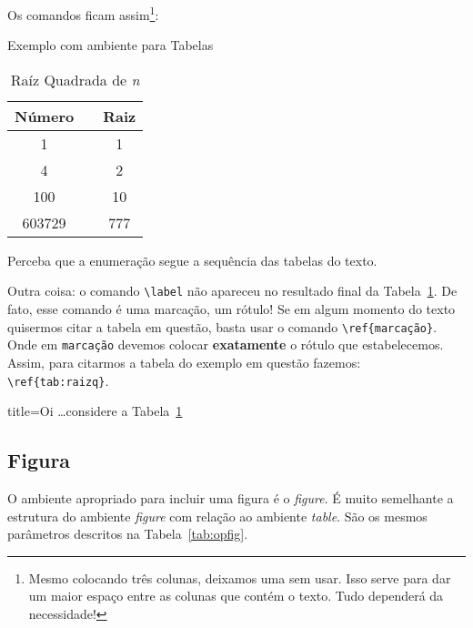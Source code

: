 Os comandos ficam assim\footnote{
  Mesmo colocando três colunas, deixamos uma sem usar.
  Isso serve para dar um maior espaço entre as colunas que contém o texto.
  Tudo dependerá da necessidade!
}:

\begin{codigo}{Exemplo com ambiente para Tabelas}{\lapis}
\begin{table}[!htbp]
  \centering
  \caption{Raíz Quadrada de \textit{n}}
  \label{tab:raizq}
  \begin{tabular}{ccc}
    \toprule
    \textbf{Número}&&\textbf{Raiz}\\
    \midrule
    1 && 1\\
    4 && 2\\
    100 && 10\\
    603729 && 777\\
   \bottomrule
  \end{tabular}
\end{table}
\end{codigo}

Perceba que a enumeração segue a sequência das tabelas do texto.

Outra coisa: o comando \Verb|\label| não apareceu no resultado final da Tabela~\ref{tab:raizq}.
De fato, esse comando é uma marcação, um rótulo!
Se em algum momento do texto quisermos citar a tabela em questão, basta usar o 
comando \Verb|\ref{marcação}|. 
Onde em \texttt{marcação} devemos colocar \textbf{exatamente} o rótulo que 
estabelecemos.
Assim, para citarmos a tabela do exemplo em questão fazemos: \Verb|\ref{tab:raizq}|.

\begin{tcblisting}{title=Oi}
\ldots considere a Tabela~\ref{tab:raizq}
\end{tcblisting}

%
  \subsection{Figura}
%

O ambiente apropriado para incluir uma figura é o \textit{figure}.
É muito semelhante a estrutura do ambiente \textit{figure} com relação ao 
ambiente \textit{table}. 
São os mesmos parâmetros descritos na Tabela~\ref{tab:opfig}.

